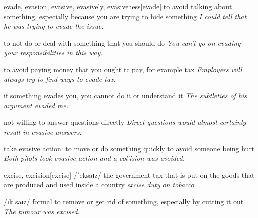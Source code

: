 \begin{word}{evade, evasion, evasive, evasively, evasiveness}[evade]
    to avoid talking about something, especially because you are trying to hide something
    \textit{I could tell that he was trying to evade the issue.}

    to not do or deal with something that you should do
    \textit{You can't go on evading your responsibilities in this way.}

    to avoid paying money that you ought to pay, for example tax
    \textit{Employers will always try to find ways to evade tax.}

    if something evades you, you cannot do it or understand it
    \textit{The subtleties of his argument evaded me.}

    not willing to answer questions directly
    \textit{Direct questions would almost certainly result in evasive answers.}

    take evasive action: to move or do something quickly to avoid someone being hurt
    \textit{Both pilots took evasive action and a collision was avoided.}
\end{word}

\begin{word}{excise, excision}[excise]
    /ˈeksaɪz/ the government tax that is put on the goods that are produced and used inside a country
    \textit{excise duty on tobacco}

    /ɪkˈsaɪz/ formal to remove or get rid of something, especially by cutting it out
    \textit{The tumour was excised.}
\end{word}